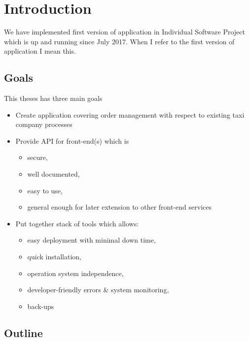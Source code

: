 \chapter{Introduction}

We have implemented first version of application in Individual Software Project which is up and running since July 2017. When I refer to the first version of application I mean this.
\section{Goals}
This theses has three main goals 
\begin{itemize}
	\item Create application covering order management with respect to existing taxi company processes
	\item Provide API for front-end(s) which is
	\begin{itemize}
		\item secure,
		\item well documented,
		\item easy to use,
		\item general enough for later extension to other front-end services
	\end{itemize}
	\item Put together stack of tools which allows:
	\begin{itemize}
		\item easy deployment with minimal down time,
		\item quick installation,
		\item operation system independence,
		\item developer-friendly errors \& system monitoring,
		\item back-ups
	\end{itemize}
\end{itemize}

\section{Outline}